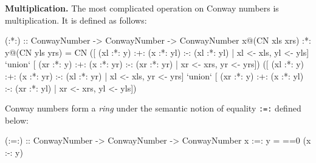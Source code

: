 \documentclass[authoryear,preprint]{sigplanconf}
\begin{document}
\noindent\textbf{Multiplication.} The most complicated operation on Conway
numbers is multiplication. It is defined as follows:
\begin{code}
(:*:) :: ConwayNumber -> ConwayNumber -> ConwayNumber
x@(CN xls xrs) :*: y@(CN yls yrs) = 
  CN 
    ([ (xl :*: y) :+: (x :*: yl) :-: (xl :*: yl)
     | xl <- xls, yl <- yls] `union`
     [ (xr :*: y) :+: (x :*: yr) :-: (xr :*: yr)
     | xr <- xrs, yr <- yrs])
    ([ (xl :*: y) :+: (x :*: yr) :-: (xl :*: yr)
     | xl <- xls, yr <- yrs] `union`
     [ (xr :*: y) :+: (x :*: yl) :-: (xr :*: yl)
     | xr <- xrs, yl <- yls])
\end{code}

Conway numbers form a \emph{ring} under the semantic notion of equality
\lstinline$:=:$ defined below:
\begin{code}
(:=:) :: ConwayNumber -> ConwayNumber -> ConwayNumber
x :=: y = ==0 (x :-: y)
\end{code}



\softraggedright

\end{document}
